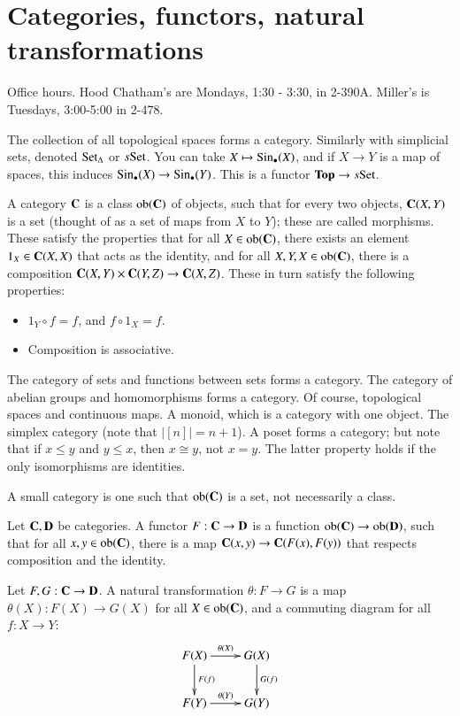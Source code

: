 \section{Categories, functors, natural transformations}
Office hours. Hood Chatham's are Mondays, 1:30 - 3:30, in 2-390A. Miller's is Tuesdays, 3:00-5:00 in 2-478.

The collection of all topological spaces forms a category. Similarly with simplicial sets, denoted ${\mathrm{Set}}_{\Delta}$ or $s{\mathrm{Set}}$. You can take $X\mapsto \mathrm{Sin}_\bullet(X)$, and if $X\to Y$ is a map of spaces, this induces $\mathrm{Sin}_\bullet(X)\to\mathrm{Sin}_\bullet(Y)$. This is a functor $\mathbf{Top}\to s{\mathrm{Set}}$.
\begin{definition}
A category $\mathbf C$ is a class $\mathrm{ob}(\mathbf C)$ of objects, such that for every two objects, $\mathbf C(X,Y)$ is a set (thought of as a set of maps from $X$ to $Y$); these are called morphisms. These satisfy the properties that for all $X\in\mathrm{ob}(\mathbf C)$, there exists an element $1_X\in\mathbf C(X,X)$ that acts as the identity, and for all $X,Y,X\in\mathrm{ob}(\mathbf C)$, there is a composition $\mathbf C(X,Y)\times\mathbf C(Y,Z)\to\mathbf C(X,Z)$. These in turn satisfy the following properties:
\begin{itemize}
\item $1_Y\circ f=f$, and $f\circ 1_X=f$.
\item Composition is associative.
\end{itemize}
\end{definition}
\begin{example}
The category of sets and functions between sets forms a category. The category of abelian groups and homomorphisms forms a category. Of course, topological spaces and continuous maps. A monoid, which is a category with one object. The simplex category (note that $|[n]|=n+1$). A poset forms a category; but note that if $x\leq y$ and $y\leq x$, then $x\cong y$, not $x=y$. The latter property holds if the only isomorphisms are identities.
\end{example}
A small category is one such that $\mathrm{ob}(\mathbf C)$ is a set, not necessarily a class.
\begin{definition}
Let $\mathbf C,\mathbf D$ be categories. A functor $F:\mathbf C\to\mathbf D$ is a function $\mathrm{ob}(\mathbf C)\to\mathrm{ob}(\mathbf D)$, such that for all $x,y\in\mathrm{ob}(\mathbf C)$, there is a map $\mathbf C(x,y)\to\mathbf C(F(x),F(y))$ that respects composition and the identity.

Let $F,G:\mathbf C\to\mathbf D$. A natural transformation $\theta:F\to G$ is a map $\theta(X):F(X)\to G(X)$ for all $X\in\mathrm{ob}(\mathbf C)$, and a commuting diagram for all $f:X\to Y$:
\begin{equation*}
\xymatrix{F(X)\ar[d]^{F(f)}\ar[r]^{\theta(X)} & G(X)\ar[d]^{G(f)}\\
F(Y)\ar[r]^{\theta(Y)} & G(Y)}
\end{equation*}
\end{definition}
